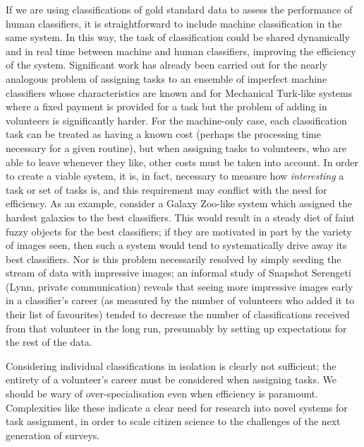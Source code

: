 \documentclass{ar2e}
\begin{document}
If we are using classifications of gold standard data to assess the
performance of human classifiers, it is straightforward to include machine
classification in the same system. In this way, the task of classification
could be shared dynamically and in real time between machine and human
classifiers, improving the efficiency of the system. Significant work has
already been carried out for the nearly analogous problem of assigning tasks
to an ensemble of imperfect machine classifiers whose characteristics are
known  and for Mechanical Turk-like systems where a fixed payment is provided
for a task but the problem of adding in volunteers is significantly harder.
For the machine-only case, each classification task can be treated as having a
known cost (perhaps the processing time necessary for a given routine), but
when assigning tasks to  volunteers, who are able to leave whenever they like,
other costs must be taken into account. In order to create a viable system, it
is, in fact, necessary to measure how {\it interesting}  a task or set of
tasks is, and this requirement may conflict with the need for efficiency. As
an example, consider a Galaxy Zoo-like system which assigned the hardest
galaxies to the best classifiers. This would result in a steady diet of faint
fuzzy objects for the best classifiers; if they are motivated in part by the
variety of images seen, then such a system would tend to systematically drive
away its best classifiers. Nor is this problem necessarily resolved by simply
seeding the stream of data with impressive images; an informal study of
Snapshot Serengeti (Lynn, private communication) reveals that seeing more
impressive images early in a classifier's career (as measured by the number of
volunteers who added it to their list of favourites) tended to decrease the
number of classifications received from that volunteer in the long run,
presumably by setting up expectations for the rest of the data.

Considering individual classifications in isolation is clearly not sufficient;
the entirety of a volunteer's career must be considered when assigning tasks.
We should be wary of over-specialisation even when efficiency is paramount.
Complexities like these indicate a clear need for research into novel systems
for task assignment, in order to scale citizen science to the challenges of
the next generation of surveys. 



\end{document}
